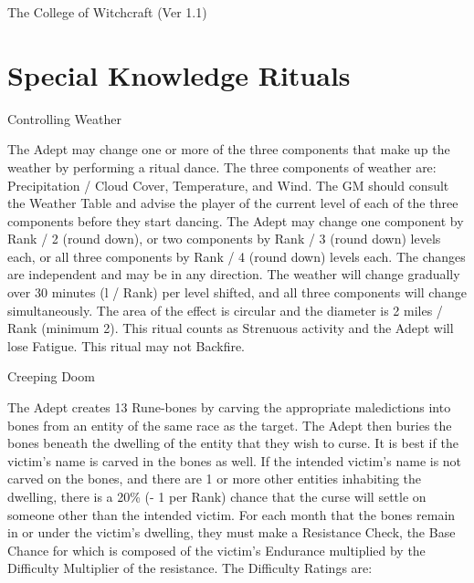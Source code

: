 \begin{Chapter}{The College of Witchcraft (Ver 1.1)}
\section{Special Knowledge Rituals}

\begin{ritual}[R-1]{Controlling Weather}

\begin{effects}
The Adept may change one or more of the three components that make up
the weather by performing a ritual dance. The three components of
weather are: Precipitation / Cloud Cover, Temperature, and Wind.  The
GM should consult the Weather Table and advise the player of the
current level of each of the three components before they start
dancing.  The Adept may change one component by Rank / 2 (round down),
or two components by Rank / 3 (round down) levels each, or all three
components by Rank / 4 (round down) levels each.  The changes are
independent and may be in any direction.  The weather will change
gradually over 30 minutes (l / Rank) per level shifted, and all three
components will change simultaneously.  The area of the effect is
circular and the diameter is 2 miles / Rank (minimum 2). This ritual
counts as Strenuous activity and the Adept will lose Fatigue. This
ritual may not Backfire.
\end{effects}
\end{ritual}

\begin{ritual}[R-2]{Creeping Doom}

\begin{effects}
The Adept creates 13 Rune-bones by carving the appropriate
maledictions into bones from an entity of the same race as the
target. The Adept then buries the bones beneath the dwelling of the
entity that they wish to curse.  It is best if the victim’s name is
carved in the bones as well.  If the intended victim’s name is not
carved on the bones, and there are 1 or more other entities inhabiting
the dwelling, there is a 20\% (- 1 per Rank) chance that the curse
will settle on someone other than the intended victim.  For each month
that the bones remain in or under the victim’s dwelling, they must
make a Resistance Check, the Base Chance for which is composed of the
victim’s Endurance multiplied by the Difficulty Multiplier of the
resistance. The Difficulty Ratings are:


\end{effects}
\end{ritual}
\end{Chapter}
